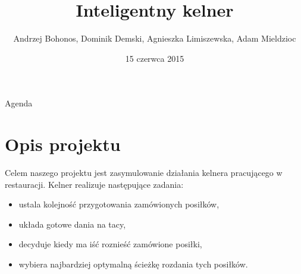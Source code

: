 \documentclass[a4paper,10pt]{beamer}
\date{15 czerwca 2015}
\title{Inteligentny kelner}
\author[A. Bohonos, D. Demski, A. Limiszewska, A. Mieldzioc]{Andrzej Bohonos, Dominik Demski, Agnieszka Limiszewska, Adam Mieldzioc}
\begin{document}
		\begin{frame}
			\titlepage
		\end{frame}
		\begin{frame}{Agenda}
			\tableofcontents
		\end{frame}
		
		\section{Opis projektu}
		\begin{frame}
			Celem naszego projektu jest zasymulowanie działania kelnera pracującego w restauracji. Kelner realizuje następujące zadania:
			\begin{itemize}
				\item ustala kolejność przygotowania zamówionych posiłków,
				\item układa gotowe dania na tacy, 
				\item decyduje kiedy ma iść roznieść zamówione posiłki,
				\item wybiera najbardziej optymalną ścieżkę rozdania tych posiłków. 
			\end{itemize}
		\end{frame}
		
\end{document}
